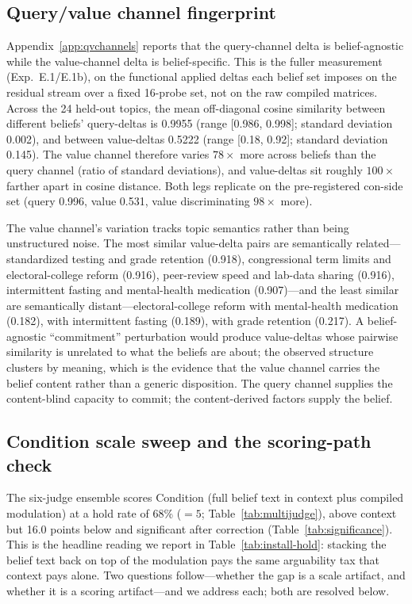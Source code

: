 \subsection{Query/value channel fingerprint}
\label{app:qv}
Appendix~\ref{app:qvchannels} reports that the query-channel delta is
belief-agnostic while the value-channel delta is belief-specific. This is the fuller
measurement (Exp.~E.1/E.1b), on the functional applied deltas each belief set imposes on
the residual stream over a fixed 16-probe set, not on the raw compiled matrices. Across the
24 held-out topics, the mean off-diagonal cosine similarity between different beliefs'
query-deltas is 0.9955 (range [0.986, 0.998]; standard deviation 0.002), and between
value-deltas 0.5222 (range [0.18, 0.92]; standard deviation 0.145). The value channel
therefore varies \(78\times\) more across beliefs than the query channel (ratio of standard
deviations), and value-deltas sit roughly \(100\times\) farther apart in cosine distance.
Both legs replicate on the pre-registered con-side set (query 0.996, value 0.531, value
discriminating \(98\times\) more).

The value channel's variation tracks topic semantics rather than being unstructured noise.
The most similar value-delta pairs are semantically related---standardized testing and
grade retention (0.918), congressional term limits and electoral-college reform (0.916),
peer-review speed and lab-data sharing (0.916), intermittent fasting and mental-health
medication (0.907)---and the least similar are semantically distant---electoral-college
reform with mental-health medication (0.182), with intermittent fasting (0.189), with grade
retention (0.217). A belief-agnostic ``commitment'' perturbation would produce value-deltas
whose pairwise similarity is unrelated to what the beliefs are about; the observed structure
clusters by meaning, which is the evidence that the value channel carries the belief content
rather than a generic disposition. The query channel supplies the content-blind capacity to
commit; the content-derived factors supply the belief.

\subsection{Condition \condD{} scale sweep and the scoring-path check}
\label{app:dscale}
The six-judge ensemble scores Condition \condD{} (full belief text in context plus compiled
modulation) at a hold rate of 68\% (\(=5\); Table~\ref{tab:multijudge}), above context but
16.0 points below \condF{} and significant after correction (Table~\ref{tab:significance}). This
is the headline reading we report in Table~\ref{tab:install-hold}: stacking the belief text back
on top of the modulation pays the same arguability tax that context pays alone. Two questions
follow---whether the gap is a scale artifact, and whether it is a scoring artifact---and we
address each; both are resolved below.

